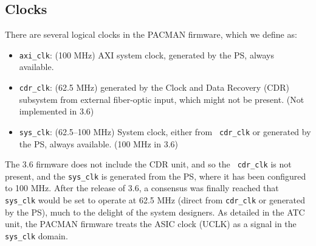 \documentclass[12pt]{article}
\begin{document}
\subsection{Clocks}

There are several logical clocks in the PACMAN firmware, which we define as:
\begin{itemize}
\item {\tt axi\_clk}: (100 MHz) AXI system clock, generated by the PS,
  always available.
\item {\tt cdr\_clk}: (62.5 MHz) generated by the Clock and Data Recovery
  (CDR) subsystem from external fiber-optic input, which might not be
  present. (Not implemented in 3.6)
\item {\tt sys\_clk}: (62.5--100 MHz) System clock, either from {\tt
  cdr\_clk} or generated by the PS, always available. (100 MHz in 3.6)
\end{itemize}

The 3.6 firmware does not include the CDR unit, and so the {\tt
  cdr\_clk} is not present, and the {\tt sys\_clk} is generated from
the PS, where it has been configured to 100 MHz.  After the release of
3.6, a consensus was finally reached that {\tt sys\_clk} would be set
to operate at 62.5 MHz (direct from {\tt cdr\_clk} or generated by the
PS), much to the delight of the system designers.  As detailed in the
ATC unit, the PACMAN firmware treats the ASIC clock (UCLK) as a signal in the
{\tt sys\_clk} domain.
\end{document}
